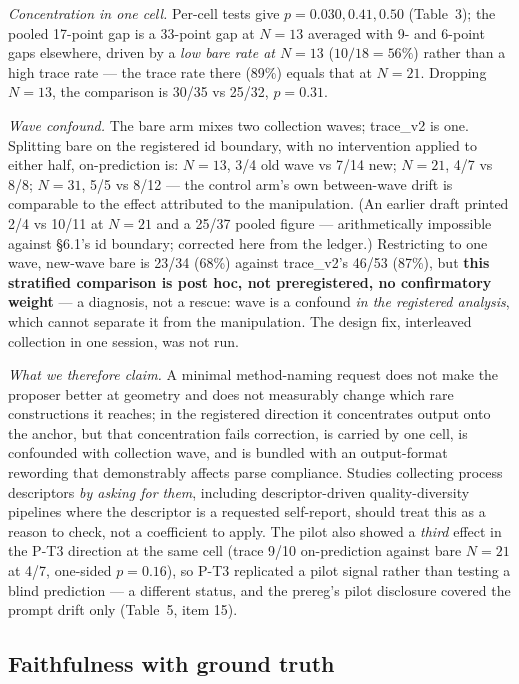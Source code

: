 \documentclass[11pt]{article}
\begin{document}
\textit{Concentration in one cell.} Per-cell tests give $p = 0.030, 0.41, 0.50$ (Table~3); the pooled
17-point gap is a 33-point gap at $N = 13$ averaged with 9- and 6-point gaps elsewhere, driven by a
\textit{low bare rate at $N = 13$} ($10/18 = 56\%$) rather than a high trace rate --- the trace rate there (89\%)
equals that at $N = 21$. Dropping $N = 13$, the comparison is 30/35 vs 25/32, $p = 0.31$.

\textit{Wave confound.} The bare arm mixes two collection waves; trace\_v2 is one. Splitting bare on the
registered id boundary, with no intervention applied to either half, on-prediction is: $N = 13$, 3/4
old wave vs 7/14 new; $N = 21$, 4/7 vs 8/8; $N = 31$, 5/5 vs 8/12 --- the control arm's own
between-wave drift is comparable to the effect attributed to the manipulation. (An earlier draft
printed 2/4 vs 10/11 at $N = 21$ and a 25/37 pooled figure --- arithmetically impossible against
\S6.1's id boundary; corrected here from the ledger.) Restricting to one
wave, new-wave bare is 23/34 (68\%) against trace\_v2's 46/53 (87\%), but \textbf{this stratified
comparison is post hoc, not preregistered, no confirmatory weight} --- a diagnosis, not a rescue:
wave is a confound \textit{in the registered analysis}, which cannot separate it from the manipulation.
The design fix, interleaved collection in one session, was not run.

\textit{What we therefore claim.} A minimal method-naming request does not make the proposer better at
geometry and does not measurably change which rare constructions it reaches; in the registered
direction it concentrates output onto the anchor, but that concentration fails correction, is
carried by one cell, is confounded with collection wave, and is bundled with an output-format
rewording that demonstrably affects parse compliance. Studies collecting process descriptors \textit{by
asking for them}, including descriptor-driven quality-diversity pipelines where the descriptor is
a requested self-report, should treat this as a reason to check, not a coefficient to apply. The
pilot also showed a \textit{third} effect in the P-T3 direction at the same cell (trace 9/10
on-prediction against bare $N = 21$ at 4/7, one-sided $p = 0.16$), so P-T3 replicated a pilot signal
rather than testing a blind prediction --- a different status, and the prereg's pilot disclosure
covered the prompt drift only (Table~5, item 15).

\subsection{Faithfulness with ground truth}
\end{document}
